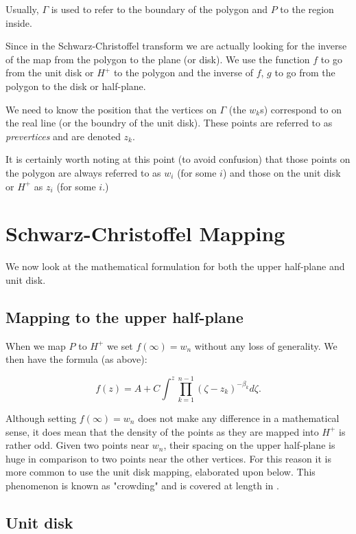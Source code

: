 \documentclass[a4paper,10pt]{amsart}
\newcommand{\sch}{Schwarz-Christoffel }
\begin{document}
Usually, $\Gamma$ is used to refer to the boundary of the polygon and $P$ to the region inside.

Since in the \sch transform we are actually looking for the inverse of the map from the polygon to the plane (or disk). We use the function $f$ to go from the unit disk or $H^+$ to the polygon and the inverse of $f$, $g$ to go from the polygon to the disk or half-plane.  

We need to know the position that the vertices on $\Gamma$ (the $w_k$s) correspond to on the real line (or the boundry of the unit disk). These points are referred to as \emph{prevertices} and are denoted $z_k$.

It is certainly worth noting at this point (to avoid confusion) that those points on the polygon are always referred to as $w_i$ (for some $i$) and those on the unit disk or $H^+$ as $z_i$ (for some $i$.)



 
\section{\sch Mapping}

We now look at the mathematical formulation for both the upper half-plane and unit disk.

\subsection{Mapping to the upper half-plane}

When we map $P$ to $H^+$ we set $f(\infty) = w_n$ without any loss of generality. We then have the formula (as above):

\begin{equation}
f(z) = A + C \int^z \prod_{k=1}^{n-1} (\zeta-z_k)^{-\beta_k} d\zeta.
\end{equation}

Although setting $f(\infty) = w_n$ does not make any difference in a mathematical sense, it does mean that the density of the points as they are mapped into $H^+$ is rather odd. Given two points near $w_n$, their spacing on the upper half-plane is huge in comparison to two points near the other vertices. For this reason it is more common to use the unit disk mapping, elaborated upon below. This phenomenon is known as "crowding" and is covered at length in \cite{driscoll}. 
\subsection{Unit disk}
\end{document}
